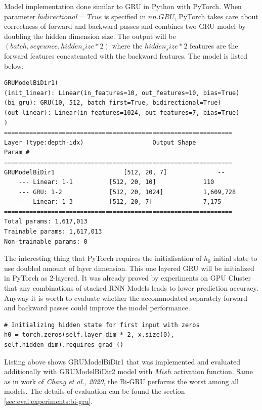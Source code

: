 Model implementation done similar to GRU in Python with PyTorch. When parameter $bidirectional=True$ is specified in $nn.GRU$, PyTorch takes care about correctness of forward and backward passes and combines two GRU model by doubling the hidden dimension size. The output will be $(batch, seqeunce, hidden_size * 2)$ where the $hidden_size * 2$ features are the forward features concatenated with the backward features. The model is listed below: 
\begin{lstlisting}[caption={Bidirectional GRU Model},captionpos=b]
GRUModelBiDir1(
(init_linear): Linear(in_features=10, out_features=10, bias=True)
(bi_gru): GRU(10, 512, batch_first=True, bidirectional=True)
(out_linear): Linear(in_features=1024, out_features=7, bias=True)
)
===============================================================
Layer (type:depth-idx)                   Output Shape              Param #
===============================================================
GRUModelBiDir1                   [512, 20, 7]              --
	--- Linear: 1-1          [512, 20, 10]             110
	--- GRU: 1-2             [512, 20, 1024]           1,609,728
	--- Linear: 1-3          [512, 20, 7]              7,175
===============================================================
Total params: 1,617,013
Trainable params: 1,617,013
Non-trainable params: 0
\end{lstlisting}

The interesting thing that PyTorch requires the initialisation of $h_0$ initial state to use doubled amount of layer dimension. This one layered GRU will be initialized in PyTorch as 2-layered. It was already proved by experiments on GPU Cluster that any combinations of stacked RNN Models leads to lower prediction accuracy. Anyway it is worth to evaluate whether the accommodated separately forward and backward passes could improve the model performance.  
\begin{lstlisting}[caption={Bidirectional GRU h0 Layer},captionpos=b]
# Initializing hidden state for first input with zeros
h0 = torch.zeros(self.layer_dim * 2, x.size(0), self.hidden_dim).requires_grad_()
\end{lstlisting}

Listing above shows GRUModelBiDir1 that was implemented and evaluated additionally with GRUModelBiDir2 model with $Mish$ activation function. Same as in work of \textit{Chang et al., 2020}, the Bi-GRU performs the worst among all models. The details of evaluation can be found the section \ref{sec:eval:experiments:bi-gru}.

